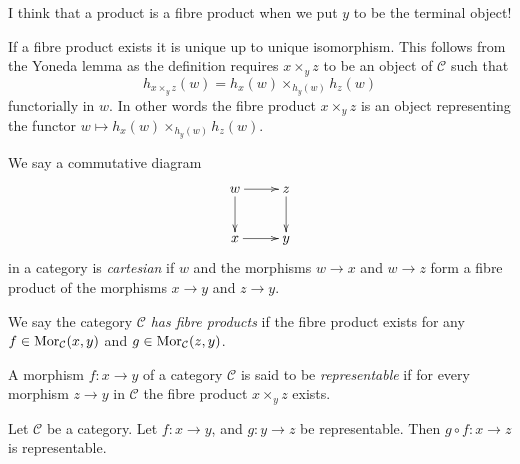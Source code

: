 \begin{remark}
\label{remark-product-is-fibre-product}
I think that a product is a fibre product
when we put $y$ to be the terminal object!
\end{remark}


\noindent
If a fibre product exists it is unique up to
unique
isomorphism. This follows from the Yoneda
lemma as
the definition requires $x \times_y z$ to be
an object
of $\mathcal{C}$ such that
$$
h_{x \times_y z}(w) = h_x(w) \times_{h_y(w)}
h_z(w)
$$
functorially in $w$. In other words the fibre
product $x \times_y z$
is an object representing the functor
$w \mapsto h_x(w) \times_{h_y(w)} h_z(w)$.

\begin{definition}
\label{definition-cartesian}
We say a commutative diagram
$$
\xymatrix{
w \ar[r] \ar[d] &
z \ar[d] \\
x \ar[r] &
y
}
$$
in a category is {\it cartesian} if $w$ and
the morphisms $w \to x$ and
$w \to z$ form a fibre product of the
morphisms $x \to y$ and $z \to y$.
\end{definition}

\begin{definition}
\label{definition-has-fibre-products}
We say the category $\mathcal{C}$ {\it has
fibre products} if
the fibre product exists for any $f\in
\mathop{\mathrm{Mor}}\nolimits_{\mathcal C}(x, y)$
and $g\in \mathop{\mathrm{Mor}}\nolimits_{\mathcal C}(z, y)$.
\end{definition}

\begin{definition}
\label{definition-representable-morphism}
A morphism $f : x \to y$ of a category
$\mathcal{C}$ is said to be
{\it representable} if for every morphism $z
\to y$
in $\mathcal{C}$ the fibre product $x
\times_y z$ exists.
\end{definition}

\begin{lemma}
\label{lemma-composition-representable}
Let $\mathcal{C}$ be a category.
Let $f : x \to y$, and $g : y \to z$ be
representable.
Then $g \circ f : x \to z$ is representable.
\end{lemma}


